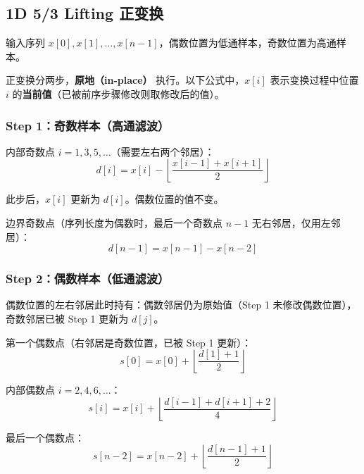 \subsection{1D 5/3 Lifting 正变换}

输入序列 $x[0], x[1], \ldots, x[n-1]$，偶数位置为低通样本，奇数位置为高通样本。

正变换分两步，\textbf{原地（in-place）} 执行。以下公式中，$x[i]$ 表示变换过程中位置 $i$ 的\textbf{当前值}（已被前序步骤修改则取修改后的值）。

\subsubsection{Step 1：奇数样本（高通滤波）}

内部奇数点 $i = 1, 3, 5, \ldots$（需要左右两个邻居）：
\begin{equation}\label{eq:dwt-fwd-odd}
d[i] = x[i] - \left\lfloor \frac{x[i-1] + x[i+1]}{2} \right\rfloor
\end{equation}

此步后，$x[i]$ 更新为 $d[i]$。偶数位置的值不变。

边界奇数点（序列长度为偶数时，最后一个奇数点 $n-1$ 无右邻居，仅用左邻居）：
\begin{equation}\label{eq:dwt-fwd-odd-boundary}
d[n-1] = x[n-1] - x[n-2]
\end{equation}

\subsubsection{Step 2：偶数样本（低通滤波）}

偶数位置的左右邻居此时持有：偶数邻居仍为原始值（Step 1 未修改偶数位置），奇数邻居已被 Step 1 更新为 $d[j]$。

第一个偶数点（右邻居是奇数位置，已被 Step 1 更新）：
\begin{equation}\label{eq:dwt-fwd-even-first}
s[0] = x[0] + \left\lfloor \frac{d[1] + 1}{2} \right\rfloor
\end{equation}

内部偶数点 $i = 2, 4, 6, \ldots$：
\begin{equation}\label{eq:dwt-fwd-even-internal}
s[i] = x[i] + \left\lfloor \frac{d[i-1] + d[i+1] + 2}{4} \right\rfloor
\end{equation}

最后一个偶数点：
\begin{equation}\label{eq:dwt-fwd-even-last}
s[n-2] = x[n-2] + \left\lfloor \frac{d[n-1] + 1}{2} \right\rfloor
\end{equation}

